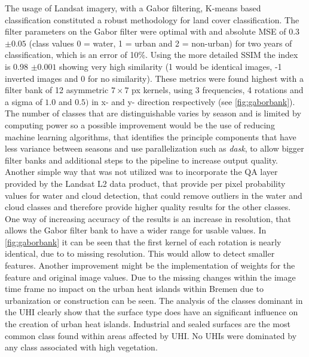 \documentclass[12pt,a4paper, english,twoside]{scrartcl}
\begin{document}
    The usage of Landsat imagery, with a Gabor filtering, K-means based classification constituted a robust methodology for land cover classification.
    The filter parameters on the Gabor filter were optimal with and absolute MSE of 0.3 $\pm 0.05$ (class values 0 = water, 1 = urban and 2 = non-urban) for two years of classification, which is an error of 10\%.
    Using the more detailed \gls{SSIM} the index is 0.98 $\pm 0.001$ showing very high similarity (1 would be identical images, -1 inverted images and 0 for no similarity). 
    These metrics were found highest with a filter bank of 12 asymmetric $7\times7$ px kernels, using 3 frequencies, 4 rotations and a sigma of $1.0$ and $0.5)$ in x- and y- direction respectively (see \cref{fig:gaborbank}).
    The number of classes that are distinguishable varies by season and is limited by computing power so a possible improvement would be the use of reducing machine learning algorithms, that identifies the principle components that have less variance between seasons and use parallelization such as \textit{dask}\autocite{dask}, to allow bigger filter banks and additional steps to the pipeline to increase output quality.
    Another simple way that was not utilized was to incorporate the QA layer provided by the Landsat L2 data product, that provide per pixel probability values for water and cloud detection, that could remove outliers in the water and cloud classes and therefore provide higher quality results for the other classes. 
    One way of increasing accuracy of the results is an increase in resolution, that allows the Gabor filter bank to have a wider range for usable values. 
    In \cref{fig:gaborbank} it can be seen that the first kernel of each rotation is nearly identical, due to to missing resolution. 
    This would allow to detect smaller features.
    Another improvement might be the implementation of weights for the feature and original image values.
    Due to the missing changes within the image time frame no impact on the urban heat islands within Bremen due to urbanization or construction can be seen. 
    The analysis of the classes dominant in the \gls{UHI} clearly show that the surface type does have an significant influence on the creation of urban heat islands. 
    Industrial and sealed surfaces are the most common class found within areas affected by \gls{UHI}.
    No \glspl{UHI} were dominated by any class associated with high vegetation. 
    
    
\end{document}

